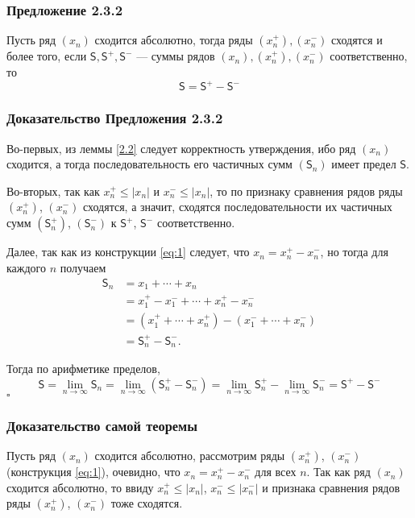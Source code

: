 \documentclass[a4paper]{article}
\newcommand{\qed}{\hfill$\square$}
\begin{document}
\subsubsection*{Предложение 2.3.2}
Пусть ряд $(x_n)$ сходится абсолютно, тогда ряды $(x_n^+),(x_n^-)$ сходятся и более того, если $\mathsf{S},\mathsf{S}^+,\mathsf{S}^-$ — суммы рядов $(x_n),(x_n^+),(x_n^-)$ соответственно, то
\begin{equation}\label{eq:2}
    \mathsf{S}=\mathsf{S}^+-\mathsf{S}^-
\end{equation}
\subsubsection*{Доказательство Предложения 2.3.2}
Во-первых, из леммы \ref{2.2} следует корректность утверждения, ибо ряд $(x_n)$ сходится, а тогда последовательность его частичных сумм $(\mathsf{S}_n)$ имеет предел $\mathsf{S}.$

Во-вторых, так как $x_n^+ \le |x_n|$ и $x_n^- \le |x_n|$, то по признаку сравнения рядов ряды $(x_n^+)$, $(x_n^-)$ сходятся, а значит, сходятся последовательности их частичных сумм $(\mathsf{S}_n^+)$, $(\mathsf{S}_n^-)$ к $\mathsf{S}^+$, $\mathsf{S}^-$ соответственно.

Далее, так как из конструкции \ref{eq:1} следует, что $x_n = x_n^+- x_n^-$, но тогда для каждого $n$ получаем
$$\begin{aligned}
\mathsf{S}_n  &= x_1 + \cdots + x_n \\
&= x_1^+ - x_1^- + \cdots + x_n^+ - x_n^- \\
&= \left( x_1^+ + \cdots + x_n^+ \right) - \left(x_1^- + \cdots + x_n^- \right) \\
&= \mathsf{S}_n^+ - \mathsf{S}_n^-.
\end{aligned}$$

Тогда по арифметике пределов, 
$$
\mathsf{S} = \lim_{n \to \infty} \mathsf{S}_n = \lim_{n\to \infty}(\mathsf{S}_n^+ - \mathsf{S}_n^-) = \lim_{n\to \infty} \mathsf{S}_n^+ - \lim_{n\to \infty}\mathsf{S}_n^- = \mathsf{S}^+ - \mathsf{S}^-
$$\qed
\subsubsection*{Доказательство самой теоремы}
Пусть ряд $(x_n)$ сходится абсолютно, рассмотрим ряды $(x_n^+)$, $(x_n^-)$ (конструкция \ref{eq:1}), очевидно, что $x_n = x_n^+ - x_n^-$ для всех $n.$ Так как ряд $(x_n)$ сходится абсолютно, то ввиду $x_n^+ \le |x_n|$, $x_n^- \le |x_n^-|$ и признака сравнения рядов ряды $(x_n^+)$, $(x_n^-)$ тоже сходятся.
\end{document}
